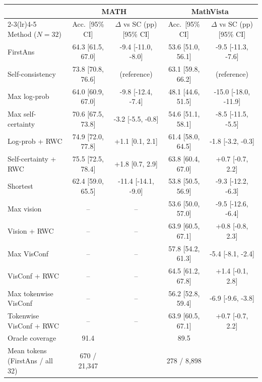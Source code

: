 \begin{tabular}{lcccc}
\toprule
& \multicolumn{2}{c}{MATH} & \multicolumn{2}{c}{MathVista} \\ \cmidrule(lr){2-3}\cmidrule(lr){4-5}
Method ($N=32$) & Acc.\ [95\% CI] & $\Delta$ vs SC (pp) [95\% CI] & Acc.\ [95\% CI] & $\Delta$ vs SC (pp) [95\% CI] \\
\midrule
FirstAns & 64.3 [61.5, 67.0] & -9.4 [-11.0, -8.0] & 53.6 [51.0, 56.1] & -9.5 [-11.3, -7.6] \\
Self-consistency & 73.8 [70.8, 76.6] & (reference) & 63.1 [59.8, 66.2] & (reference) \\
Max log-prob & 64.0 [60.9, 67.0] & -9.8 [-12.4, -7.4] & 48.1 [44.6, 51.5] & -15.0 [-18.0, -11.9] \\
Max self-certainty & 70.6 [67.5, 73.8] & -3.2 [-5.5, -0.8] & 54.6 [51.1, 58.1] & -8.5 [-11.5, -5.5] \\
Log-prob + RWC & 74.9 [72.0, 77.8] & +1.1 [0.1, 2.1] & 61.4 [58.0, 64.5] & -1.8 [-3.2, -0.3] \\
Self-certainty + RWC & 75.5 [72.5, 78.4] & +1.8 [0.7, 2.9] & 63.8 [60.4, 67.0] & +0.7 [-0.7, 2.2] \\
Shortest & 62.4 [59.0, 65.5] & -11.4 [-14.1, -9.0] & 53.8 [50.5, 56.9] & -9.3 [-12.2, -6.3] \\
Max vision & -- & -- & 53.6 [50.0, 57.0] & -9.5 [-12.6, -6.4] \\
Vision + RWC & -- & -- & 63.9 [60.5, 67.1] & +0.8 [-0.8, 2.3] \\
Max VisConf & -- & -- & 57.8 [54.2, 61.3] & -5.4 [-8.1, -2.4] \\
VisConf + RWC & -- & -- & 64.5 [61.2, 67.8] & +1.4 [-0.1, 2.8] \\
Max tokenwise VisConf & -- & -- & 56.2 [52.8, 59.4] & -6.9 [-9.6, -3.8] \\
Tokenwise VisConf + RWC & -- & -- & 63.9 [60.5, 67.1] & +0.7 [-0.7, 2.2] \\ \midrule
Oracle coverage & 91.4 &  & 89.5 \\
Mean tokens (FirstAns / all 32) & 670 / 21,347 &  & 278 / 8,898 \\
\bottomrule
\end{tabular}
